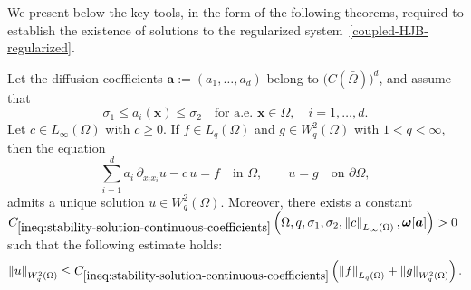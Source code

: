 \documentclass[final,onefignum,onetabnum]{mousaviart}
\begin{document}
	{\color{red}
		We present below the key tools, in the form of the following theorems, required to establish the existence of solutions to the regularized system~\eqref{coupled-HJB-regularized}.
	}
	\begin{theorem}
		\label{lem:well-posedness-linear-equation-smooth-coefficients}
		Let the diffusion coefficients $\boldsymbol{a} := (a_1,\dots,a_d)$ belong to
		$\bigl(C(\bar{\Omega})\bigr)^d$, and assume that 
		\[
		\sigma_1 \le a_i(\boldsymbol{x}) \le \sigma_2
		\quad \text{for a.e.\ } \boldsymbol{x} \in \Omega,\quad i = 1,\dots,d.
		\]
		Let $c \in L_{\infty}(\Omega)$
		with $c \ge 0$.
		If $ f \in L_q(\Omega)$ and
		$  g \in W^{2}_q(\Omega)$
		with $1 < q < \infty$, then the equation
		\begin{equation}
			\label{eq:-linear-system-smooth-coefficients}
			\sum_{i=1}^{d}
			a_i\, \partial_{x_i x_i}  u
			-
			c \,  u
			=
			f
			\quad \text{in } \Omega,
			\qquad
			u =  g
			\quad \text{on } \partial\Omega,
		\end{equation}
		admits a unique solution
		$ u \in W^{2}_q(\Omega)$.
		Moreover, there exists {\color{blue}a constant}\\ $C_{\ref{ineq:stability-solution-continuous-coefficients}} \left( \Omega, q, \sigma_1, \sigma_2, \left\| c \right\|_{L_{\infty}(\Omega)},
		\boldsymbol{\omega}[\boldsymbol{a}]	
		\right) > 0$ such that the following estimate holds:
		\begin{equation}
			\label{ineq:stability-solution-continuous-coefficients}
			\left\|  u \right\|_{W^{2}_q(\Omega)}
			\le
			C_{\ref{ineq:stability-solution-continuous-coefficients}}
			\left(
			\left\|  f \right\|_{L_q(\Omega)}
			+
			\left\|  g \right\|_{W^{2}_q(\Omega)}
			\right).
		\end{equation}
	\end{theorem}
\end{document}
